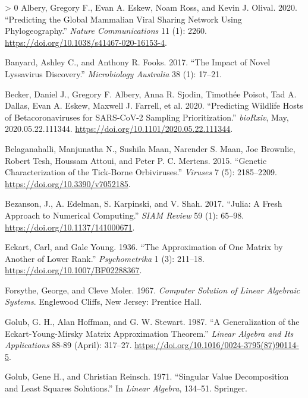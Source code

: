 \documentclass[10pt,oneside]{article}
\newlength{\cslhangindent}
\newenvironment{CSLReferences}[3] %
 {%
  \setlength{\parindent}{0pt}
  \ifodd #1 \everypar{\setlength{\hangindent}{\cslhangindent}}\ignorespaces\fi
  \ifnum #2 > 0
  \setlength{\parskip}{#2\baselineskip}
  \fi
 }%
 {}
\begin{document}
\hypertarget{refs}{}
\begin{CSLReferences}{1}{0}
\leavevmode\hypertarget{ref-Albery2020PreGlo}{}%
Albery, Gregory F., Evan A. Eskew, Noam Ross, and Kevin J. Olival. 2020.
{``Predicting the Global Mammalian Viral Sharing Network Using
Phylogeography.''} \emph{Nature Communications} 11 (1): 2260.
\url{https://doi.org/10.1038/s41467-020-16153-4}.

\leavevmode\hypertarget{ref-Banyard2017ImpNov}{}%
Banyard, Ashley C., and Anthony R. Fooks. 2017. {``The Impact of Novel
Lyssavirus Discovery.''} \emph{Microbiology Australia} 38 (1): 17--21.

\leavevmode\hypertarget{ref-Becker2020PreWil}{}%
Becker, Daniel J., Gregory F. Albery, Anna R. Sjodin, Timothée Poisot,
Tad A. Dallas, Evan A. Eskew, Maxwell J. Farrell, et al. 2020.
{``Predicting Wildlife Hosts of Betacoronaviruses for SARS-CoV-2
Sampling Prioritization.''} \emph{bioRxiv}, May, 2020.05.22.111344.
\url{https://doi.org/10.1101/2020.05.22.111344}.

\leavevmode\hypertarget{ref-Belaganahalli2015GenCha}{}%
Belaganahalli, Manjunatha N., Sushila Maan, Narender S. Maan, Joe
Brownlie, Robert Tesh, Houssam Attoui, and Peter P. C. Mertens. 2015.
{``Genetic Characterization of the Tick-Borne Orbiviruses.''}
\emph{Viruses} 7 (5): 2185--2209.
\url{https://doi.org/10.3390/v7052185}.

\leavevmode\hypertarget{ref-Bezanson2017JulFre}{}%
Bezanson, J., A. Edelman, S. Karpinski, and V. Shah. 2017. {``Julia: A
Fresh Approach to Numerical Computing.''} \emph{SIAM Review} 59 (1):
65--98. \url{https://doi.org/10.1137/141000671}.

\leavevmode\hypertarget{ref-Eckart1936AppOne}{}%
Eckart, Carl, and Gale Young. 1936. {``The Approximation of One Matrix
by Another of Lower Rank.''} \emph{Psychometrika} 1 (3): 211--18.
\url{https://doi.org/10.1007/BF02288367}.

\leavevmode\hypertarget{ref-Forsythe1967ComSol}{}%
Forsythe, George, and Cleve Moler. 1967. \emph{Computer Solution of
Linear Algebraic Systems}. Englewood Cliffs, New Jersey: Prentice Hall.

\leavevmode\hypertarget{ref-Golub1987GenEck}{}%
Golub, G. H., Alan Hoffman, and G. W. Stewart. 1987. {``A Generalization
of the Eckart-Young-Mirsky Matrix Approximation Theorem.''} \emph{Linear
Algebra and Its Applications} 88-89 (April): 317--27.
\url{https://doi.org/10.1016/0024-3795(87)90114-5}.

\leavevmode\hypertarget{ref-Golub1971SinVal}{}%
Golub, Gene H., and Christian Reinsch. 1971. {``Singular Value
Decomposition and Least Squares Solutions.''} In \emph{Linear Algebra},
134--51. Springer.


\end{CSLReferences}
\end{document}

